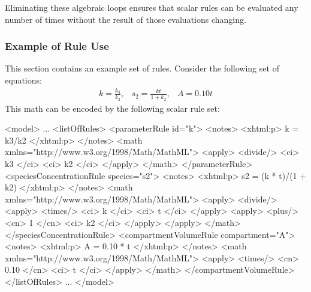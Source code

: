 \documentclass[10pt,twocolumntoc]{cekarticle}
\newcommand{\D}{\displaystyle}
\begin{document}
Eliminating these algebraic loops ensures that scalar rules can be
evaluated any number of times without the result of those evaluations
changing.


\subsubsection{Example of Rule Use}
\label{sec:eg-rule-use}

This section contains an example set of rules.  Consider the following
set of equations:
\begin{equation*}
  \begin{array}{lll}
    k = \D\frac{k_3}{k_2}, & s_2 = \D\frac{k t}{1 + k_2}, & A = 0.10 t
  \end{array}
\end{equation*}
This math can be encoded by the following scalar rule set:
\begin{example}
<model>
    ...
    <listOfRules>
        <parameterRule id="k">
            <notes>
                <xhtml:p>
                    k = k3/k2
                </xhtml:p>
            </notes>
            <math xmlns="http://www.w3.org/1998/Math/MathML">
                <apply>
                    <divide/>
                    <ci> k3 </ci>
                    <ci> k2 </ci>
                </apply>
            </math>
        </parameterRule>
        <speciesConcentrationRule species="s2">
            <notes>
                <xhtml:p>
                    s2 = (k * t)/(1 + k2)
                </xhtml:p>
            </notes>
            <math xmlns="http://www.w3.org/1998/Math/MathML">
                <apply>
                    <divide/>
                    <apply>
                        <times/>
                        <ci> k </ci>
                        <ci> t </ci>
                    </apply>
                    <apply>
                        <plus/>
                        <cn> 1 </cn>
                        <ci> k2 </ci>
                    </apply>
                </apply>
            </math>
        </speciesConcentrationRule>
        <compartmentVolumeRule compartment="A">
            <notes>
                <xhtml:p>
                    A = 0.10 * t
                </xhtml:p>
            </notes>
            <math xmlns="http://www.w3.org/1998/Math/MathML">
                <apply>
                    <times/>
                    <cn> 0.10 </cn>
                    <ci> t </ci>
                </apply>
            </math>
        </compartmentVolumeRule>
    </listOfRules>
    ...
</model>
\end{example}
\end{document}
